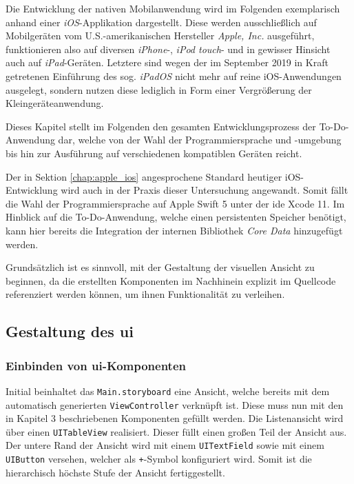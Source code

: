 Die Entwicklung der nativen Mobilanwendung wird im Folgenden exemplarisch anhand einer \textit{iOS}-Applikation dargestellt. Diese werden ausschließlich auf Mobilgeräten vom U.S.-amerikanischen Hersteller \textit{Apple, Inc.} ausgeführt, funktionieren also auf diversen \textit{iPhone}-, \textit{iPod touch}- und in gewisser Hinsicht auch auf \textit{iPad}-Geräten. Letztere sind wegen der im September 2019 in Kraft getretenen Einführung des sog. \textit{iPadOS} nicht mehr auf reine iOS-Anwendungen ausgelegt, sondern nutzen diese lediglich in Form einer Vergrößerung der Kleingeräteanwendung.

Dieses Kapitel stellt im Folgenden den gesamten Entwicklungsprozess der To-Do-Anwendung dar, welche von der Wahl der Programmiersprache und -umgebung bis hin zur Ausführung auf verschiedenen kompatiblen Geräten reicht.

Der in Sektion \ref{chap:apple_ios} angesprochene Standard heutiger iOS-Entwicklung wird auch in der Praxis dieser Untersuchung angewandt. Somit fällt die Wahl der Programmiersprache auf Apple Swift 5 unter der \acs{ide} Xcode 11. Im Hinblick auf die To-Do-Anwendung, welche einen persistenten Speicher benötigt, kann hier bereits die Integration der internen Bibliothek \textit{Core Data} hinzugefügt werden.

Grundsätzlich ist es sinnvoll, mit der Gestaltung der visuellen Ansicht zu beginnen, da die erstellten Komponenten im Nachhinein explizit im Quellcode referenziert werden können, um ihnen Funktionalität zu verleihen.

\subsection{Gestaltung des \acl{ui}} \label{chap:ios_ui}
\subsubsection{Einbinden von \ac{ui}-Komponenten}
Initial beinhaltet das \texttt{Main.storyboard} eine Ansicht, welche bereits mit dem automatisch generierten \texttt{ViewController} verknüpft ist. Diese muss nun mit den in Kapitel 3 beschriebenen Komponenten gefüllt werden. Die Listenansicht wird über einen \texttt{UITableView} realisiert. Dieser füllt einen großen Teil der Ansicht aus. Der untere Rand der Ansicht wird mit einem \texttt{UITextField} sowie mit einem \texttt{UIButton} versehen, welcher als \texttt{+}-Symbol konfiguriert wird. Somit ist die hierarchisch höchste Stufe der Ansicht fertiggestellt.

